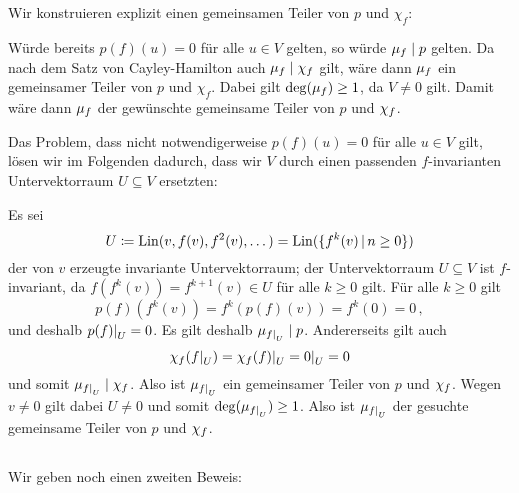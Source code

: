 \section{}





\subsection{}

Wir konstruieren explizit einen gemeinsamen Teiler von $p$ und $\chi_f$:

Würde bereits $p(f)(u) = 0$ für alle $u \in V$ gelten, so würde $\mu_{f} \mathrel{|} p$ gelten.
Da nach dem Satz von Cayley-Hamilton auch $\mu_{f} \mathrel{|} \chi_{f}$ gilt, wäre dann $\mu_{f}$ ein gemeinsamer Teiler von $p$ und $\chi_f$.
Dabei gilt $\deg(\mu_{f}) \geq 1$, da $V \neq 0$ gilt.
Damit wäre dann $\mu_{f}$ der gewünschte gemeinsame Teiler von $p$ und $\chi_{f}$.

Das Problem, dass nicht notwendigerweise $p(f)(u) = 0$ für alle $u \in V$ gilt, lösen wir im Folgenden dadurch, dass wir $V$ durch einen passenden $f$-invarianten Untervektorraum $U \subseteq V$ ersetzten:

Es sei
\[
            U
  \defined  \Lin(v, f(v), f^2(v), \dotsc)
  =         \Lin( \{ f^k(v) \suchthat n \geq 0 \} )
\]
der von $v$ erzeugte invariante Untervektorraum;
der Untervektorraum $U \subseteq V$ ist $f$-invariant, da $f(f^k(v)) = f^{k+1}(v) \in U$ für alle $k \geq 0$ gilt.
Für alle $k \geq 0$ gilt
\[
    p(f)( f^k(v) )
  = f^k( p(f)(v) )
  = f^k( 0 )
  = 0 \,,
\]
und deshalb $\restrict{p(f)}{U} = 0$.
Es gilt deshalb $\minpoly{\restrict{f}{U}} \divides p$.
Andererseits gilt auch
\[
    \charpoly{f}(\restrict{f}{U})
  = \restrict{\charpoly{f}(f)}{U}
  = \restrict{0}{U}
  = 0
\]
und somit $\minpoly{\restrict{f}{U}} \divides \charpoly{f}$.
Also ist $\minpoly{\restrict{f}{U}}$ ein gemeinsamer Teiler von $p$ und $\chi_{f}$.
Wegen $v \neq 0$ gilt dabei $U \neq 0$ und somit $\deg( \minpoly{\restrict{f}{U}} ) \geq 1$.
Also ist $\minpoly{\restrict{f}{U}}$ der gesuchte gemeinsame Teiler von $p$ und $\chi_{f}$.





\subsection{}

Wir geben noch einen zweiten Beweis:

